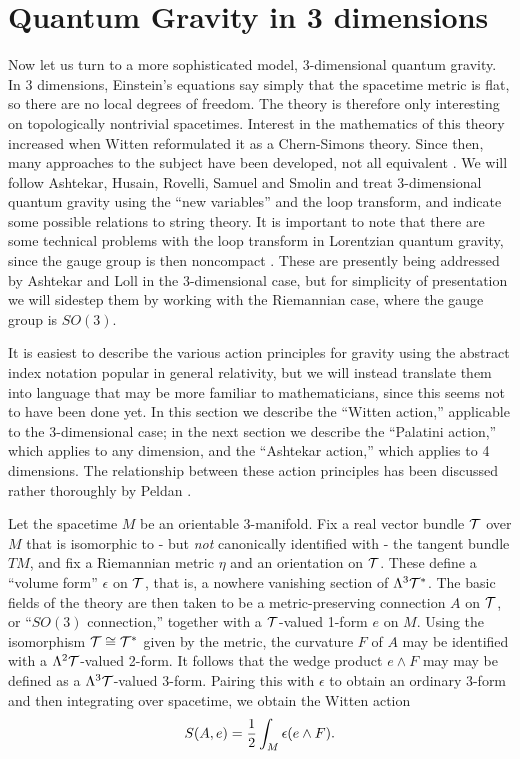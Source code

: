 \documentclass[12pt]{article}
\newcommand{\eps}{\epsilon}
\newcommand{\T}{{\cal T}}
\newcommand{\hf}{{1\over 2}}
\begin{document}
\section{Quantum Gravity in 3 dimensions}

Now let us turn to a more sophisticated model, 3-dimensional  quantum
gravity.   In 3 dimensions, Einstein's equations say simply that the
spacetime metric is flat, so there are no local degrees of freedom. The
theory is therefore only interesting on topologically nontrivial
spacetimes.  Interest in the mathematics of this theory increased when
Witten \cite{Witten2} reformulated it as a Chern-Simons theory.  Since
then, many approaches to the subject have been developed, not all
equivalent \cite{Carlip}.   We will follow Ashtekar, Husain, Rovelli,
Samuel and Smolin \cite{A,AHRSS} and treat 3-dimensional quantum gravity
using the ``new variables'' and the loop transform, and indicate some
possible relations to string theory.  It is important to note that  there
are some technical problems with the loop transform in  Lorentzian quantum
gravity, since the gauge group is then noncompact \cite{Marolf}.  These are
presently being addressed by Ashtekar and Loll \cite{ALoll} in the
3-dimensional case,  but for simplicity of presentation we will sidestep
them by working with the Riemannian case, where the gauge group is $SO(3)$.

It is easiest to describe the various action principles for gravity using
the abstract index notation popular in general relativity, but we will
instead translate them into language that may be more familiar to
mathematicians, since this seems not to have been done yet.
In this section we describe the ``Witten action,''
applicable to the 3-dimensional case; in the next section we describe the
``Palatini action,'' which applies to any dimension, and the ``Ashtekar
action,'' which applies to 4 dimensions.  The relationship between these
action principles has been discussed rather thoroughly by Peldan
\cite{Peldan}.

Let the spacetime $M$ be an orientable 3-manifold.  Fix a real vector
bundle $\T$ over $M$ that is isomorphic to - but {\it not} canonically
identified with - the tangent bundle $TM$, and fix a Riemannian metric
$\eta$ and an orientation on $\T$.  These define a ``volume form'' $\eps$ on
$\T$, that is, a nowhere vanishing section of $\Lambda^3 \T^\ast$.
The basic fields of the theory are then taken to be a metric-preserving
connection $A$ on $\T$, or ``$SO(3)$ connection,'' together with a
$\T$-valued 1-form $e$ on $M$.   Using the isomorphism
$\T \cong \T^\ast$ given by the metric, the curvature $F$ of $A$ may be
identified with a $\Lambda^2 \T$-valued 2-form.  It follows that the wedge
product $e \wedge F$ may may be defined as a $\Lambda^3 \T$-valued 3-form.
Pairing this with $\eps$ to obtain an ordinary 3-form and then integrating
over spacetime, we obtain the Witten action
\[       S(A,e) = \hf \int_M \eps(e \wedge F)  .\]
\end{document}
